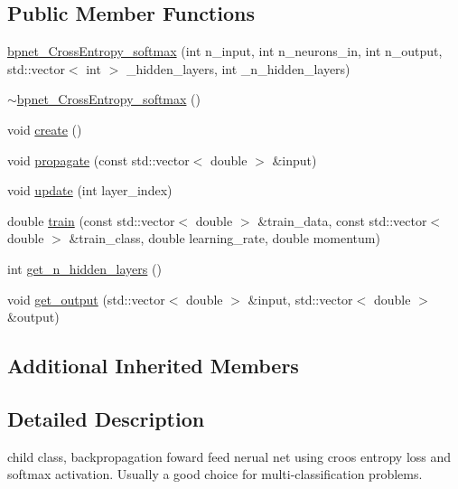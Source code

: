 \subsection*{Public Member Functions}
\begin{DoxyCompactItemize}
\item 
\hyperlink{classbpnet__CrossEntropy__softmax_af27dfc3aa73d018c4c5d9f27ae7057f1}{bpnet\-\_\-\-Cross\-Entropy\-\_\-softmax} (int n\-\_\-input, int n\-\_\-neurons\-\_\-in, int n\-\_\-output, std\-::vector$<$ int $>$ \-\_\-hidden\-\_\-layers, int \-\_\-n\-\_\-hidden\-\_\-layers)
\item 
\hyperlink{classbpnet__CrossEntropy__softmax_a369e61d402dde2a069fdc7cd7126c63e}{$\sim$bpnet\-\_\-\-Cross\-Entropy\-\_\-softmax} ()
\item 
void \hyperlink{classbpnet__CrossEntropy__softmax_a220ba65a1d29b86e4d200416d38c931d}{create} ()
\item 
void \hyperlink{classbpnet__CrossEntropy__softmax_a5bc91db68cdcb204fb1e46101cc731cd}{propagate} (const std\-::vector$<$ double $>$ \&input)
\item 
void \hyperlink{classbpnet__CrossEntropy__softmax_ab14df99bdcaa05a7b9c1a3b631a1662a}{update} (int layer\-\_\-index)
\item 
double \hyperlink{classbpnet__CrossEntropy__softmax_ad5945e5fb0ba6311a06833aa53023841}{train} (const std\-::vector$<$ double $>$ \&train\-\_\-data, const std\-::vector$<$ double $>$ \&train\-\_\-class, double learning\-\_\-rate, double momentum)
\item 
int \hyperlink{classbpnet__CrossEntropy__softmax_a9a4d4c77b996c83b0e881ae22868512b}{get\-\_\-n\-\_\-hidden\-\_\-layers} ()
\item 
void \hyperlink{classbpnet__CrossEntropy__softmax_aef5c2eb0db95b6bdca4cab71248f544c}{get\-\_\-output} (std\-::vector$<$ double $>$ \&input, std\-::vector$<$ double $>$ \&output)
\end{DoxyCompactItemize}
\subsection*{Additional Inherited Members}


\subsection{Detailed Description}
child class, backpropagation foward feed nerual net using croos entropy loss and softmax activation. Usually a good choice for multi-\/classification problems. 

